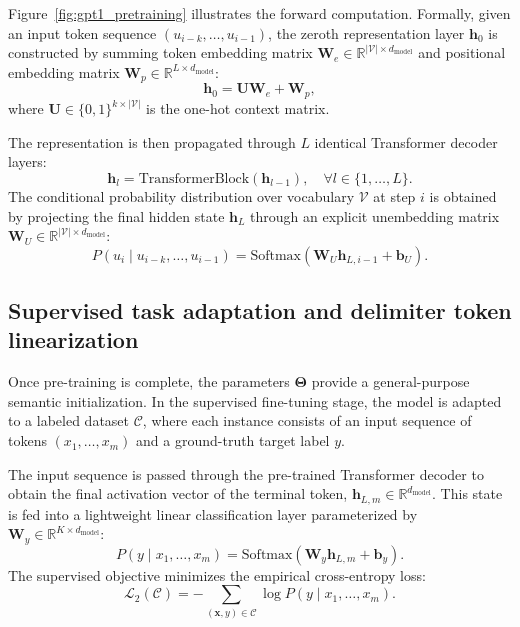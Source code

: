 \documentclass[../../../main.tex]{subfiles}
\begin{document}
Figure~\ref{fig:gpt1_pretraining} illustrates the forward computation. Formally, given an input token sequence $(u_{i-k}, \dots, u_{i-1})$, the zeroth representation layer $\mathbf{h}_0$ is constructed by summing token embedding matrix $\mathbf{W}_e \in \mathbb{R}^{|\mathcal{V}| \times d_{\text{model}}}$ and positional embedding matrix $\mathbf{W}_p \in \mathbb{R}^{L \times d_{\text{model}}}$:
\begin{equation}
\mathbf{h}_0 = \mathbf{U} \mathbf{W}_e + \mathbf{W}_p,
\label{eq:gpt1_input_representation}
\end{equation}
where $\mathbf{U} \in \{0, 1\}^{k \times |\mathcal{V}|}$ is the one-hot context matrix.

The representation is then propagated through $L$ identical Transformer decoder layers:
\begin{equation}
\mathbf{h}_l = \text{TransformerBlock}(\mathbf{h}_{l-1}), \quad \forall l \in \{1, \dots, L\}.
\label{eq:gpt1_layer_pass}
\end{equation}
The conditional probability distribution over vocabulary $\mathcal{V}$ at step $i$ is obtained by projecting the final hidden state $\mathbf{h}_L$ through an explicit unembedding matrix $\mathbf{W}_U \in \mathbb{R}^{|\mathcal{V}| \times d_{\text{model}}}$:
\begin{equation}
P(u_i \mid u_{i-k}, \dots, u_{i-1}) = \text{Softmax}(\mathbf{W}_U \mathbf{h}_{L, i-1} + \mathbf{b}_U).
\label{eq:gpt1_output_prob}
\end{equation}


\subsection{Supervised task adaptation and delimiter token linearization}
\label{subsec:gpt1_finetuning}

Once pre-training is complete, the parameters $\boldsymbol{\Theta}$ provide a general-purpose semantic initialization. In the supervised fine-tuning stage, the model is adapted to a labeled dataset $\mathcal{C}$, where each instance consists of an input sequence of tokens $(x_1, \dots, x_m)$ and a ground-truth target label $y$.

The input sequence is passed through the pre-trained Transformer decoder to obtain the final activation vector of the terminal token, $\mathbf{h}_{L, m} \in \mathbb{R}^{d_{\text{model}}}$. This state is fed into a lightweight linear classification layer parameterized by $\mathbf{W}_y \in \mathbb{R}^{K \times d_{\text{model}}}$:
\begin{equation}
P(y \mid x_1, \dots, x_m) = \text{Softmax}(\mathbf{W}_y \mathbf{h}_{L, m} + \mathbf{b}_y).
\label{eq:gpt1_supervised_prob}
\end{equation}
The supervised objective minimizes the empirical cross-entropy loss:
\begin{equation}
\mathcal{L}_2(\mathcal{C}) = -\sum_{(\mathbf{x}, y) \in \mathcal{C}} \log P(y \mid x_1, \dots, x_m).
\label{eq:gpt1_supervised_loss}
\end{equation}
\end{document}
